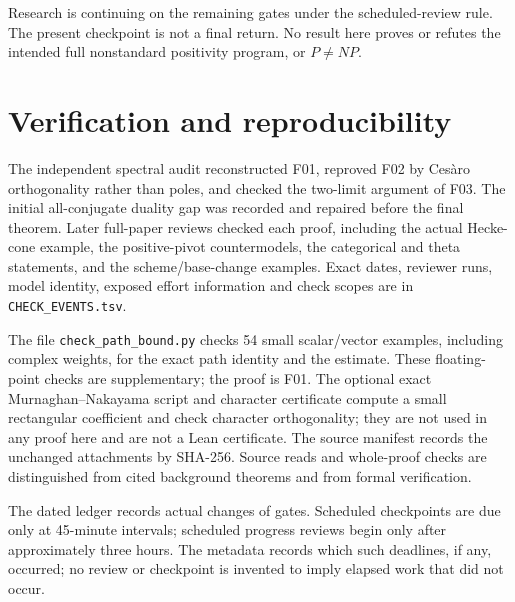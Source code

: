 \documentclass[11pt,a4paper]{article}
\theoremstyle{named}\newtheorem{finding}{Finding}[section]
\theoremstyle{definition}\newtheorem{definition}[finding]{Definition}
\theoremstyle{remark}\newtheorem{remark}[finding]{Remark}
\begin{document}
Research is continuing on the remaining gates under the scheduled-review rule. The present checkpoint is not a final return. No result here proves or refutes the intended full nonstandard positivity program, or $P\ne NP$.

\appendix
\section{Verification and reproducibility}
The independent spectral audit reconstructed F01, reproved F02 by Ces\`aro orthogonality rather than poles, and checked the two-limit argument of F03. The initial all-conjugate duality gap was recorded and repaired before the final theorem. Later full-paper reviews checked each proof, including the actual Hecke-cone example, the positive-pivot countermodels, the categorical and theta statements, and the scheme/base-change examples. Exact dates, reviewer runs, model identity, exposed effort information and check scopes are in \texttt{CHECK\_EVENTS.tsv}.

The file \texttt{check\_path\_bound.py} checks 54 small scalar/vector examples, including complex weights, for the exact path identity and the estimate. These floating-point checks are supplementary; the proof is F01. The optional exact Murnaghan--Nakayama script and character certificate compute a small rectangular coefficient and check character orthogonality; they are not used in any proof here and are not a Lean certificate. The source manifest records the unchanged attachments by SHA-256. Source reads and whole-proof checks are distinguished from cited background theorems and from formal verification.

The dated ledger records actual changes of gates. Scheduled checkpoints are due only at 45-minute intervals; scheduled progress reviews begin only after approximately three hours. The metadata records which such deadlines, if any, occurred; no review or checkpoint is invented to imply elapsed work that did not occur.
\end{document}
